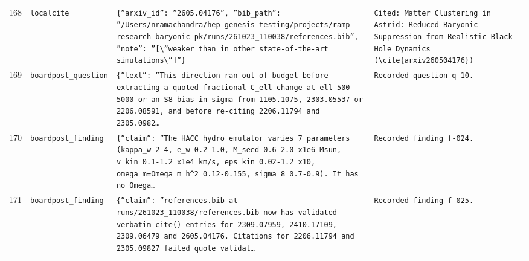 \documentclass[11pt,a4paper]{article}
\begin{document}
\begin{longtable}{@{}p{}p{}p{}p{}@{}}
168 & \texttt{local}\newline\texttt{cite} & \texttt{\{''arxiv\_\allowbreak{}id'':\allowbreak{} ''2605.04176'',\allowbreak{} ''bib\_\allowbreak{}path'':\allowbreak{} ''/\allowbreak{}Users/\allowbreak{}nramachandra/\allowbreak{}hep-genesis-testing/\allowbreak{}projects/\allowbreak{}ramp-research-baryonic-pk/\allowbreak{}runs/\allowbreak{}261023\_\allowbreak{}110038/\allowbreak{}references.bib'',\allowbreak{} ''note'':\allowbreak{} ''[\textbackslash{}\allowbreak{}''weaker than in other state-of-the-art simulations\textbackslash{}\allowbreak{}'']\allowbreak{}''\}\allowbreak{}} & \texttt{Cited:\allowbreak{} Matter Clustering in Astrid:\allowbreak{} Reduced Baryonic Suppression from Realistic Black Hole Dynamics (\textbackslash{}\allowbreak{}cite\{arxiv260504176\}\allowbreak{})\allowbreak{}} \\
169 & \texttt{board}\newline\texttt{post\_\allowbreak{}question} & \texttt{\{''text'':\allowbreak{} ''This direction ran out of budget before extracting a quoted fractional C\_\allowbreak{}ell change at ell 500-5000 or an S8 bias in sigma from 1105.1075,\allowbreak{} 2303.05537 or 2206.08591,\allowbreak{} and before re-citing 2206.11794 and 2305.0982\ldots{}\allowbreak{}} & \texttt{Recorded question q-10.} \\
170 & \texttt{board}\newline\texttt{post\_\allowbreak{}finding} & \texttt{\{''claim'':\allowbreak{} ''The HACC hydro emulator varies 7 parameters (kappa\_\allowbreak{}w 2-4,\allowbreak{} e\_\allowbreak{}w 0.2-1.0,\allowbreak{} M\_\allowbreak{}seed 0.6-2.0 x1e6 Msun,\allowbreak{} v\_\allowbreak{}kin 0.1-1.2 x1e4 km/\allowbreak{}s,\allowbreak{} eps\_\allowbreak{}kin 0.02-1.2 x10,\allowbreak{} omega\_\allowbreak{}m=\allowbreak{}Omega\_\allowbreak{}m h\textasciicircum{}\allowbreak{}2 0.12-0.155,\allowbreak{} sigma\_\allowbreak{}8 0.7-0.9)\allowbreak{}. It has no Omega\ldots{}\allowbreak{}} & \texttt{Recorded finding f-024.} \\
171 & \texttt{board}\newline\texttt{post\_\allowbreak{}finding} & \texttt{\{''claim'':\allowbreak{} ''references.bib at runs/\allowbreak{}261023\_\allowbreak{}110038/\allowbreak{}references.bib now has validated verbatim cite()\allowbreak{} entries for 2309.07959,\allowbreak{} 2410.17109,\allowbreak{} 2309.06479 and 2605.04176. Citations for 2206.11794 and 2305.09827 failed quote validat\ldots{}\allowbreak{}} & \texttt{Recorded finding f-025.} \\

\end{longtable}
\end{document}
